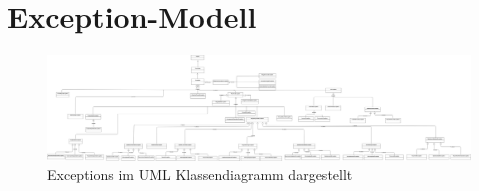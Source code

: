 \chapter{Exception-Modell}

\begin{figure}[ht]
	\centering
	\includegraphics[height=0.4\textwidth, angle=-90]{sonstige-diagramme/Exception.png}
	\caption{Exceptions im UML Klassendiagramm dargestellt}
\end{figure}